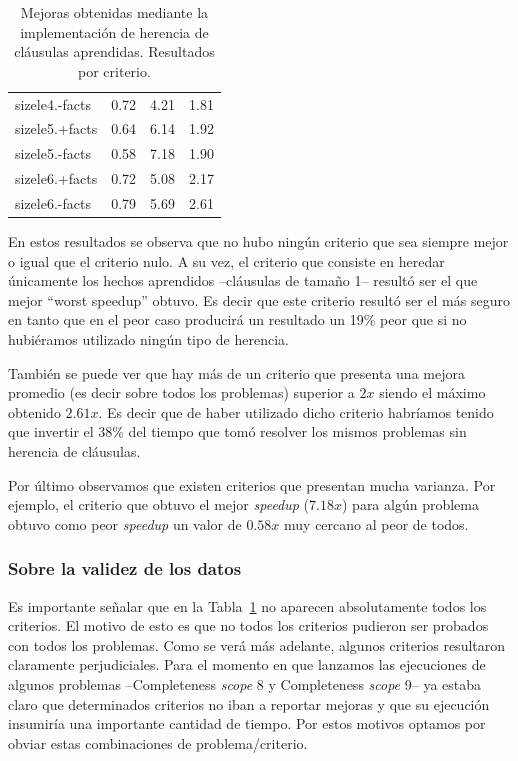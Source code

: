 \begin{table}
\begin{tabular}{lrrr}
		sizele4.-facts	&	0.72	&	4.21	&	1.81 \\
		sizele5.+facts	&	0.64	&	6.14	&	1.92 \\
		sizele5.-facts	&	0.58	&	\cellcolor{green}7.18	&	1.90 \\
		sizele6.+facts	&	0.72	&	5.08	&	2.17 \\
		sizele6.-facts	&	0.79	&	5.69	&	\cellcolor{green}2.61 \\
		\bottomrule
	\end{tabular}
	\caption{Mejoras obtenidas mediante la implementación de herencia de cláusulas aprendidas. Resultados por criterio.}
	\label{tab:rescriterios}
\end{table}

En estos resultados se observa que no hubo ningún criterio que sea siempre
mejor o igual que el criterio nulo. A su vez, el criterio que consiste en
heredar únicamente los hechos aprendidos --cláusulas de tamaño 1-- resultó ser
el que mejor ``worst speedup'' obtuvo. Es decir que este criterio resultó ser
el más seguro en tanto que en el peor caso producirá un resultado un 19\% peor
que si no hubiéramos utilizado ningún tipo de herencia.

También se puede ver que hay más de un criterio que presenta una mejora
promedio (es decir sobre todos los problemas) superior a $2x$ siendo el máximo
obtenido $2.61x$. Es decir que de haber utilizado dicho criterio habríamos
tenido que invertir el 38\% del tiempo que tomó resolver los mismos problemas
sin herencia de cláusulas.

Por último observamos que existen criterios que presentan mucha varianza. Por
ejemplo, el criterio que obtuvo el mejor \emph{speedup} ($7.18x$) para algún
problema obtuvo como peor \emph{speedup} un valor de $0.58x$ muy cercano al
peor de todos.

\subsubsection{Sobre la validez de los datos}

Es importante señalar que en la Tabla~\ref{tab:rescriterios} no aparecen
absolutamente todos los criterios. El motivo de esto es que no todos los
criterios pudieron ser probados con todos los problemas. Como se verá más
adelante, algunos criterios resultaron claramente perjudiciales. Para el
momento en que lanzamos las ejecuciones de algunos problemas --Completeness
\emph{scope} 8 y Completeness \emph{scope} 9-- ya estaba claro que
determinados criterios no iban a reportar mejoras y que su ejecución insumiría
una importante cantidad de tiempo. Por estos motivos optamos por obviar estas
combinaciones de problema/criterio.

